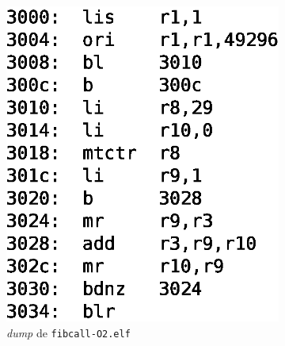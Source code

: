     \begin{figure}[ht]
      \centering
      \begin{subfigure}[t]{.20\textwidth}
        \centering
        \captionsetup{justification=centering}
        \includegraphics[scale=.4]{img/dump.eps}
        \caption{\emph{dump} de \texttt{fibcall-O2.elf}} %
        \label{fig:dump}
      \end{subfigure}
      \begin{subfigure}[t]{.20\textwidth}
        \centering
        \captionsetup{justification=centering}

\end{subfigure}
\end{figure}
